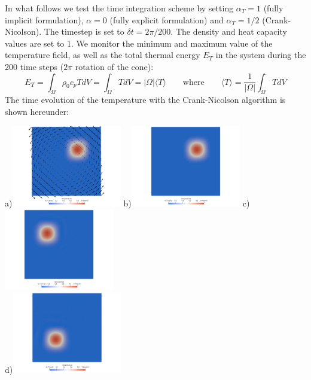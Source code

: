 In what follows we test the time integration scheme by setting $\alpha_T=1$ (fully implicit formulation), $\alpha=0$ (fully explicit formulation) and $\alpha_T=1/2$ (Crank-Nicolson).  
The timestep is set to $\delta t=2\pi/200$. The density and heat capacity values are set to 1. 
We monitor the minimum and maximum value of the temperature field, as well as the total thermal energy $E_T$ in the system during the 200 time steps ($2\pi$ rotation of the cone):
\[
E_T=\int_\Omega \rho_0 c_p T dV = \int_\Omega T dV = |\Omega| \langle T \rangle 
\qquad
\text{where}
\qquad
\langle T \rangle = \frac{1}{|\Omega|} \int_\Omega T dV
\]
The time evolution of the temperature with the Crank-Nicolson algorithm is shown hereunder:
\begin{center}
a)\includegraphics[width=4.8cm]{python_codes/fieldstone_43/images/crni/velfield}
b)\includegraphics[width=4.8cm]{python_codes/fieldstone_43/images/crni/crnitemp0000}
c)\includegraphics[width=4.8cm]{python_codes/fieldstone_43/images/crni/crnitemp0050}\\
d)\includegraphics[width=4.8cm]{python_codes/fieldstone_43/images/crni/crnitemp0100}

\end{center}
